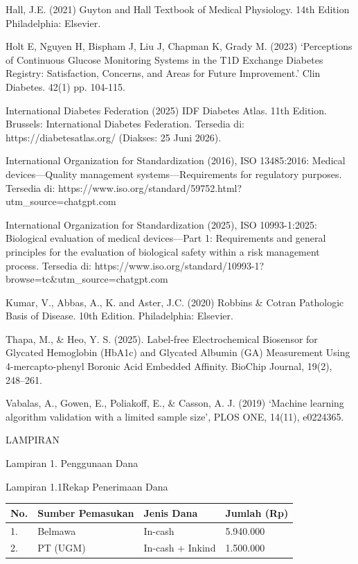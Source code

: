 \documentclass[a4paper,12pt]{article}
\begin{document}
Hall, J.E. (2021) Guyton and Hall Textbook of Medical Physiology. 14th Edition Philadelphia: Elsevier.

Holt E, Nguyen H, Bispham J, Liu J, Chapman K, Grady M. (2023) ‘Perceptions of Continuous Glucose Monitoring Systems in the T1D Exchange Diabetes Registry: Satisfaction, Concerns, and Areas for Future Improvement.’ Clin Diabetes. 42(1) pp. 104-115.

International Diabetes Federation (2025) IDF Diabetes Atlas. 11th Edition. Brussels: International Diabetes Federation. Tersedia di: https://diabetesatlas.org/ (Diakses: 25 Juni 2026).

International Organization for Standardization (2016), ISO 13485:2016: Medical devices—Quality management systems—Requirements for regulatory purposes. Tersedia di: https://www.iso.org/standard/59752.html? utm_source=chatgpt.com

International Organization for Standardization (2025), ISO 10993-1:2025: Biological evaluation of medical devices—Part 1: Requirements and general principles for the evaluation of biological safety within a risk management process. Tersedia di: https://www.iso.org/standard/10993-1?browse=tc\&utm_source=chatgpt.com

Kumar, V., Abbas, A., K. and Aster, J.C. (2020) Robbins \& Cotran Pathologic Basis of Disease. 10th Edition. Philadelphia: Elsevier.

  Thapa, M., \& Heo, Y. S. (2025). Label-free Electrochemical Biosensor for Glycated Hemoglobin (HbA1c) and Glycated Albumin (GA) Measurement Using 4-mercapto-phenyl Boronic Acid Embedded Affinity. BioChip Journal, 19(2), 248–261.

Vabalas, A., Gowen, E., Poliakoff, E., \& Casson, A. J. (2019) ‘Machine learning algorithm validation with a limited sample size’, PLOS ONE, 14(11), e0224365.

LAMPIRAN

Lampiran 1. Penggunaan Dana

  Lampiran 1.1Rekap Penerimaan Dana

\begin{longtable}{|p{}|p{}|p{}|p{}|}
\hline
No. & Sumber Pemasukan & Jenis Dana & Jumlah (Rp) \\
\hline
1. & Belmawa & In-cash & 5.940.000 \\
\hline
2. & PT (UGM) & In-cash + Inkind & 1.500.000 \\
\hline
\end{longtable}
\end{document}

